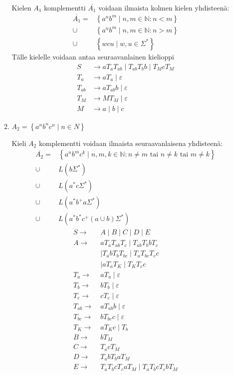 \documentclass[a4paper,11pt]{article}
\newcommand{\set}[1]{{\left\{ #1 \right\}}}
\newcommand{\Nat}{\mathbb{N}}
\begin{document}
\begin{enumerate}
\begin{enumerate}
    Kielen $A_1$ komplementti $\overline{A_1}$ voidaan ilmaista kolmen
    kielen yhdisteenä:
    \begin{align*}
      \overline{A_1}
      = & \set{a^nb^m \mid n,m \in \Nat : n < m} \\
      \cup & \set{a^nb^m \mid n,m \in \Nat : n > m} \\
      \cup & \set{wcu \mid w,u \in \Sigma^*}
    \end{align*}
    Tälle kielelle voidaan antaa seuraavanlainen kielioppi
    \begin{align*}
      S & \to aT_aT_{ab} \mid T_{ab}T_bb \mid T_McT_M \\
      T_a & \to aT_a \mid \varepsilon \\
      T_{ab} & \to aT_{ab}b \mid \varepsilon \\
      T_M & \to MT_M \mid \varepsilon \\
      M & \to a \mid b \mid c
    \end{align*}
  \item
    $A_2 = \set{a^n b^n c^n \mid n \in N}$

    Kieli $A_2$ komplementti voidaan ilmaista seuraavanlaisena
    yhdisteenä:
    \begin{align*}
      \overline{A_2}
      = & \set{a^nb^mc^k \mid n,m,k \in \Nat : n \neq m \text{ tai } n
        \neq k \text{ tai } m \neq k} \\
      \cup & L(b\Sigma^*) \\
      \cup & L(a^*c\Sigma^*) \\
      \cup & L(a^*b^+a\Sigma^*) \\
      \cup & L(a^*b^*c^+(a \cup b)\Sigma^*)
    \end{align*}
    \begin{align*}
      S \to\ & A \mid B \mid C \mid D \mid E \\
      A \to\ & aT_aT_{ab}T_c \mid T_{ab}T_bbT_c \\
      & \mid T_abT_{b}T_{bc} \mid T_aT_{bc}T_cc \\
      & \mid aT_aT_K \mid T_KT_cc \\
      T_a \to\ & aT_a \mid \varepsilon \\
      T_b \to\ & bT_b \mid \varepsilon \\
      T_c \to\ & cT_c \mid \varepsilon \\
      T_{ab} \to\ & aT_{ab}b \mid \varepsilon \\
      T_{bc} \to\ & bT_{bc}c \mid \varepsilon \\
      T_K \to\ & aT_Kc \mid T_b \\
      B \to\ & bT_M \\
      C \to\ & T_acT_M \\
      D \to\ & T_abT_baT_M \\
      E \to\ & T_aT_bcT_caT_M \mid T_aT_bcT_cbT_M
    \end{align*}
  \end{enumerate}
\end{enumerate}
\end{document}
